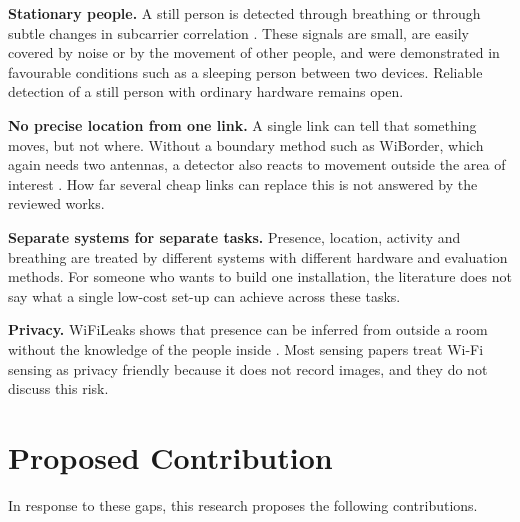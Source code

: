 \textbf{Stationary people.} A still person is detected through breathing \cite{deman,vitalsigns} or through subtle changes in subcarrier correlation \cite{wifileaks}. These signals are small, are easily covered by noise or by the movement of other people, and were demonstrated in favourable conditions such as a sleeping person between two devices. Reliable detection of a still person with ordinary hardware remains open.

\textbf{No precise location from one link.} A single link can tell that something moves, but not where. Without a boundary method such as WiBorder, which again needs two antennas, a detector also reacts to movement outside the area of interest \cite{wiborder}. How far several cheap links can replace this is not answered by the reviewed works.

\textbf{Separate systems for separate tasks.} Presence, location, activity and breathing are treated by different systems with different hardware and evaluation methods. For someone who wants to build one installation, the literature does not say what a single low-cost set-up can achieve across these tasks.

\textbf{Privacy.} WiFiLeaks shows that presence can be inferred from outside a room without the knowledge of the people inside \cite{wifileaks}. Most sensing papers treat Wi-Fi sensing as privacy friendly because it does not record images, and they do not discuss this risk.

\section{Proposed Contribution}
\label{sec:contribution}
In response to these gaps, this research proposes the following contributions.

